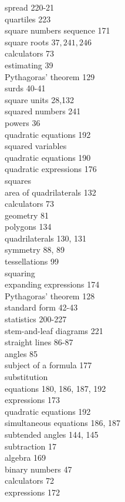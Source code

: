 \documentclass[10pt]{article}
\begin{document}
spread 220-21\\
quartiles 223\\
square numbers sequence 171\\
square roots $37,241,246$\\
calculators 73\\
estimating 39\\
Pythagoras' theorem 129\\
surds 40-41\\
square units 28,132\\
squared numbers 241\\
powers 36\\
quadratic equations 192\\
squared variables\\
quadratic equations 190\\
quadratic expressions 176\\
squares\\
area of quadrilaterals 132\\
calculators 73\\
geometry 81\\
polygons 134\\
quadrilaterals 130, 131\\
symmetry 88, 89\\
tessellations 99\\
squaring\\
expanding expressions 174\\
Pythagoras' theorem 128\\
standard form 42-43\\
statistics 200-227\\
stem-and-leaf diagrams 221\\
straight lines 86-87\\
angles 85\\
subject of a formula 177\\
substitution\\
equations 180, 186, 187, 192\\
expressions 173\\
quadratic equations 192\\
simultaneous equations 186, 187\\
subtended angles 144, 145\\
subtraction 17\\
algebra 169\\
binary numbers 47\\
calculators 72\\
expressions 172\\
\end{document}
